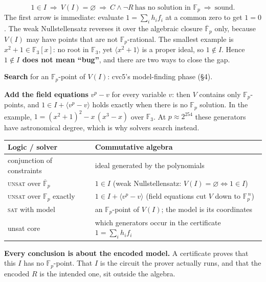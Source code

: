 \documentclass[10pt]{article}
\newcommand{\F}{\mathbb F}\newcommand{\wb}{\overline w}
\newcommand{\sect}[1]{\par\vspace{4pt}{\large\bfseries #1}\par\nobreak\vspace{1pt}}
\begin{document}
\sect{3. The test runs one way}
\[
1\in I\ \Longrightarrow\ V(I)=\varnothing\ \Longrightarrow\ C\wedge\neg R\ \text{has no solution in }\F_p\ \Longrightarrow\ \text{sound}.
\]
The first arrow is immediate: evaluate $1=\sum_i h_if_i$ at a common zero to get $1=0$. The weak Nullstellensatz reverses it over
the algebraic closure $\overline{\F}_p$ only, because $V(I)$ may have points that are not $\F_p$-rational. The smallest example is
$x^2+1\in\F_3[x]$: no root in $\F_3$, yet $\langle x^2+1\rangle$ is a proper ideal, so $1\notin I$. Hence \textbf{$1\notin I$ does not
mean ``bug''}, and there are two ways to close the gap.
\par\textbf{Search} for an $\F_p$-point of $V(I)$: cvc5's model-finding phase (\S4).
\par\textbf{Add the field equations} $v^p-v$ for every variable $v$: then $V$ contains only $\F_p$-points, and $1\in I+\langle v^p-v\rangle$
holds exactly when there is no $\F_p$ solution. In the example, $1=(x^2+1)^2-x\,(x^3-x)$ over $\F_3$. At $p\approx2^{254}$ these
generators have astronomical degree, which is why solvers search instead.
\begin{center}\begin{tabular}{@{}ll@{}}\toprule
Logic / solver & Commutative algebra\\\midrule
conjunction of constraints & ideal generated by the polynomials\\
\textsc{unsat} over $\overline{\F}_p$ & $1\in I$ (weak Nullstellensatz: $V(I)=\varnothing\iff1\in I$)\\
\textsc{unsat} over $\F_p$ exactly & $1\in I+\langle v^p-v\rangle$ (field equations cut $V$ down to $\F_p^{\,n}$)\\
\textsc{sat} with model & an $\F_p$-point of $V(I)$; the model is its coordinates\\
unsat core & which generators occur in the certificate $1=\sum_i h_if_i$\\
\bottomrule\end{tabular}\end{center}
\textbf{Every conclusion is about the encoded model.} A certificate proves that this $I$ has no $\F_p$-point. That $I$ is the
circuit the prover actually runs, and that the encoded $R$ is the intended one, sit outside the algebra.
\end{document}
